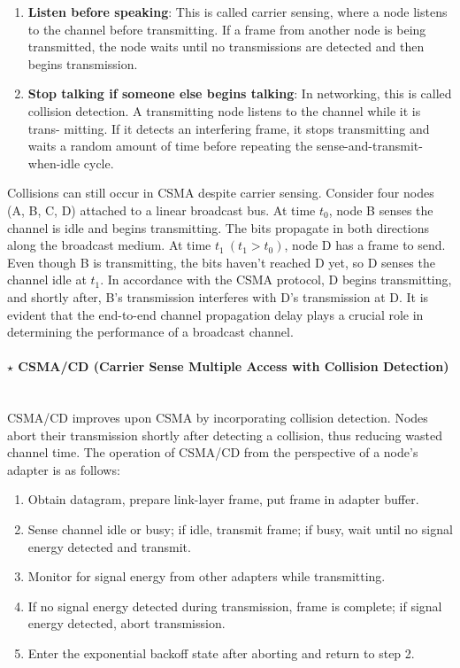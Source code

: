 \begin{enumerate}
    \item \textbf{Listen before speaking}: This is called carrier sensing, where a node listens to the channel before transmitting. If a frame from another node is being transmitted, the node waits until no transmissions are detected and then begins transmission.
    \item \textbf{Stop talking if someone else begins talking}: In networking, this is called collision detection. A transmitting node listens to the channel while it is trans- mitting. If it detects an interfering frame, it stops transmitting and waits a random amount of time before repeating the sense-and-transmit-when-idle cycle.
\end{enumerate}

\noindent Collisions can still occur in CSMA despite carrier sensing. Consider four nodes (A, B, C, D) attached to a linear broadcast bus. At time $t_0$, node B senses the channel is idle and begins transmitting. The bits propagate in both directions along the broadcast medium. At time $t_1\: (t_1 > t_0)$, node D has a frame to send. Even though B is transmitting, the bits haven't reached D yet, so D senses the channel idle at $t_1$. In accordance with the CSMA protocol, D begins transmitting, and shortly after, B's transmission interferes with D's transmission at D. It is evident that the end-to-end channel propagation delay plays a crucial role in determining the performance of a broadcast channel.

\paragraph[5.3.2.3 CSMA/CD (Carrier Sense Multiple Access with Collision Detection)]{$\pmb{\star}$ CSMA/CD (Carrier Sense Multiple Access with Collision Detection)}\mbox{}\\[4pt]
CSMA/CD improves upon CSMA by incorporating collision detection. Nodes abort their transmission shortly after detecting a collision, thus reducing wasted channel time. The operation of CSMA/CD from the perspective of a node's adapter is as follows:

\begin{enumerate}
    \item Obtain datagram, prepare link-layer frame, put frame in adapter buffer.
    \item Sense channel idle or busy; if idle, transmit frame; if busy, wait until no signal energy detected and transmit.
    \item Monitor for signal energy from other adapters while transmitting.
    \item If no signal energy detected during transmission, frame is complete; if signal energy detected, abort transmission.
    \item Enter the exponential backoff state after aborting and return to step 2.
\end{enumerate}

